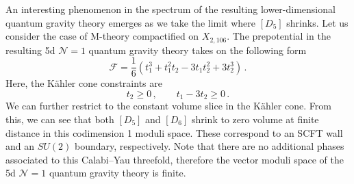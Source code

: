 \documentclass[11pt,dvipsnames]{article}
\theoremstyle{definition}
\newcommand{\cN}{\mathcal{N}}
\begin{document}
An interesting phenomenon in the spectrum of the resulting lower-dimensional quantum gravity theory emerges as we take the limit where $[D_5]$ shrinks. Let us consider the case of M-theory compactified on $X_{2,106}$. The prepotential in the resulting 5d $\mathcal{N}=1$ quantum gravity theory takes on the following form
\begin{equation}
    \mathcal{F}=\frac{1}{6}\left(t_1^3+t_1^2t_2-3t_1t_2^2+3t_2^3\right)\,.
\end{equation}
Here, the K\"ahler cone constraints are
\begin{equation}
    t_2\geq 0\,,\qquad  t_1-3t_2\geq 0\,.
\end{equation}
We can further restrict to the constant volume slice in the K\"ahler cone.
From this, we can see that both $[D_5]$ and $[D_6]$ shrink to zero volume at finite distance in this codimension 1 moduli space. These correspond to an SCFT wall and an $SU(2)$ boundary, respectively. Note that there are no additional phases associated to this Calabi--Yau threefold, therefore the vector moduli space of the 5d $\cN=1$ quantum gravity theory is finite.
\end{document}
